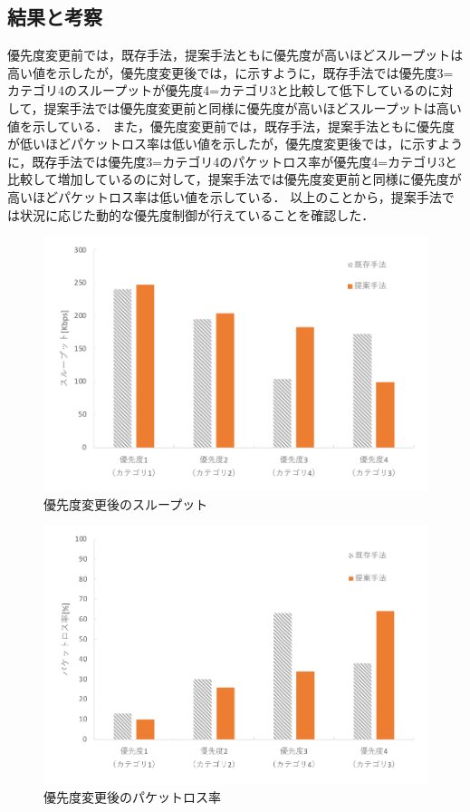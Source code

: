 \documentclass[a4paper,10pt,twocolumn,uplatex]{jsarticle}
\begin{document}
\subsection{結果と考察}
優先度変更前では，既存手法，提案手法ともに優先度が高いほどスループットは高い値を示したが，優先度変更後では，に示すように，既存手法では優先度3=カテゴリ4のスループットが優先度4=カテゴリ3と比較して低下しているのに対して，提案手法では優先度変更前と同様に優先度が高いほどスループットは高い値を示している．
また，優先度変更前では，既存手法，提案手法ともに優先度が低いほどパケットロス率は低い値を示したが，優先度変更後では，に示すように，既存手法では優先度3=カテゴリ4のパケットロス率が優先度4=カテゴリ3と比較して増加しているのに対して，提案手法では優先度変更前と同様に優先度が高いほどパケットロス率は低い値を示している．
以上のことから，提案手法では状況に応じた動的な優先度制御が行えていることを確認した．

\begin{figure}[t]
	\begin{centering}
    \includegraphics[width=0.88\linewidth]{img/throughput_resume.pdf}
    \caption{優先度変更後のスループット}
    \label{fig:throughput}
    \end{centering}
\end{figure}

\begin{figure}[t]
	\begin{centering}
    \includegraphics[width=0.88\linewidth]{img/packetloss_resume.pdf}
    \caption{優先度変更後のパケットロス率}
    \label{fig:packetloss}
    \end{centering}
\end{figure}
\end{document}

